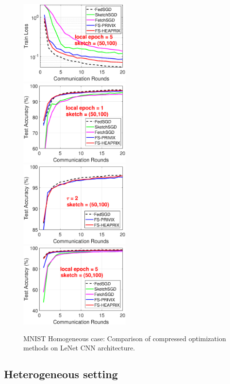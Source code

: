 \documentclass{article}
\begin{document}
\begin{figure}[H]
\begin{center}
{		\includegraphics[width=2.2in]{MNIST_figures/local5_sketch50_iid1_train_loss.eps}}
		\mbox{\hspace{-0.15in}	
		\includegraphics[width=2.2in]{MNIST_figures/local1_sketch50_iid1_test_acc.eps} \hspace{-0.15in}
		\includegraphics[width=2.2in]{MNIST_figures/local2_sketch50_iid1_test_acc.eps} \hspace{-0.15in}
		\includegraphics[width=2.2in]{MNIST_figures/local5_sketch50_iid1_test_acc.eps}
		}
	\end{center}
	\caption{MNIST Homogeneous case: Comparison of compressed optimization methods on LeNet CNN architecture.}
    \label{fig:MNIST-iid1-app}
\end{figure}

\subsection{Heterogeneous setting}
\end{document}
